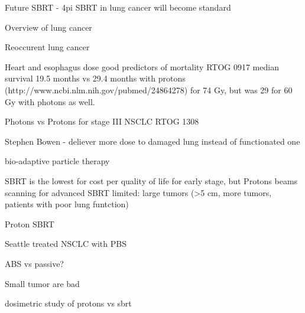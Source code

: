 \documentclass[type=dr, dr=rernat, accentcolor=tud7b,colorbacktitle, bigchapter, openright, twoside, 12pt ]{tudthesis}
\begin{document}
Future SBRT - 4pi %
SBRT in lung cancer will become standard 

Overview of lung cancer %

Reoccurent lung cancer %

Heart and esophagus dose good predictors of mortality RTOG 0917 median survival 19.5 months vs 29.4 months with protons (http://www.ncbi.nlm.nih.gov/pubmed/24864278) for 74 Gy, but was 29 for 60 Gy with photons as well.

Photons vs Protons for stage III NSCLC RTOG 1308

Stephen Bowen - deliever more dose to damaged lung instead of functionated one

bio-adaptive particle therapy

SBRT is the lowest for cost per quality of life for early stage, but Protons beams scanning for advanced %
SBRT limited: large tumors (>5 cm, more tumors, patients with poor lung funtction)

Proton SBRT %

Seattle treated NSCLC with PBS

ABS vs passive?

Small tumor are bad %

dosimetric study of protons vs sbrt %


{}
% 
\end{document}
